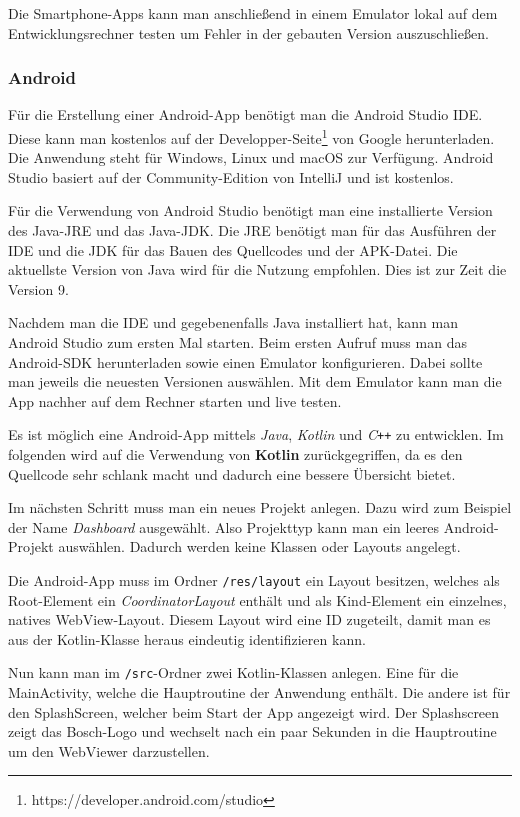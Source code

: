 Die Smartphone-Apps kann man anschließend in einem Emulator lokal auf dem Entwicklungsrechner testen um Fehler in der
gebauten Version auszuschließen.

\subsubsection{Android}
Für die Erstellung einer Android-App benötigt man die Android Studio IDE. Diese kann man kostenlos auf der
Developper-Seite\footnote{https://developer.android.com/studio} von Google herunterladen. Die Anwendung steht für
Windows, Linux und macOS zur Verfügung. Android Studio basiert auf der Community-Edition von IntelliJ und ist kostenlos.

Für die Verwendung von Android Studio benötigt man eine installierte Version des Java-JRE und das Java-JDK. Die JRE
benötigt man für das Ausführen der IDE und die JDK für das Bauen des Quellcodes und der APK-Datei. Die aktuellste
Version von Java wird für die Nutzung empfohlen. Dies ist zur Zeit die Version 9.

Nachdem man die IDE und gegebenenfalls Java installiert hat, kann man Android Studio zum ersten Mal starten. Beim ersten
Aufruf muss man das Android-SDK herunterladen sowie einen Emulator konfigurieren. Dabei sollte man jeweils die neuesten
Versionen auswählen. Mit dem Emulator kann man die App nachher auf dem Rechner starten und live testen.

Es ist möglich eine Android-App mittels \textit{Java}, \textit{Kotlin} und \textit{C\texttt{++}} zu entwicklen. Im
folgenden wird auf die Verwendung von \textbf{Kotlin} zurückgegriffen, da es den Quellcode sehr schlank macht und
dadurch eine bessere Übersicht bietet.

Im nächsten Schritt muss man ein neues Projekt anlegen. Dazu wird zum Beispiel der Name \textit{Dashboard} ausgewählt.
Also Projekttyp kann man ein leeres Android-Projekt auswählen. Dadurch werden keine Klassen oder Layouts angelegt.

Die Android-App muss im Ordner \texttt{/res/layout} ein Layout besitzen, welches als Root-Element ein
\textit{CoordinatorLayout} enthält und als Kind-Element ein einzelnes, natives WebView-Layout. Diesem Layout wird eine
ID zugeteilt, damit man es aus der Kotlin-Klasse heraus eindeutig identifizieren kann.

Nun kann man im \texttt{/src}-Ordner zwei Kotlin-Klassen anlegen. Eine für die MainActivity, welche die Hauptroutine der
Anwendung enthält. Die andere ist für den SplashScreen, welcher beim Start der App angezeigt wird. Der Splashscreen
zeigt das Bosch-Logo und wechselt nach ein paar Sekunden in die Hauptroutine um den WebViewer darzustellen.

